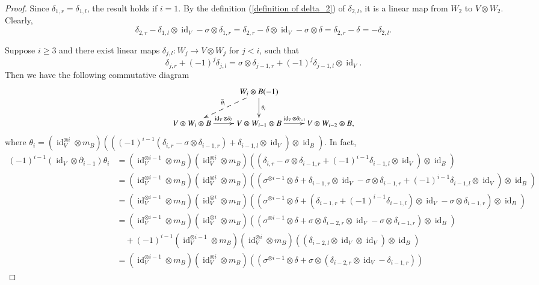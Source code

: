 \documentclass[a4paper,10pt]{amsart}
\theoremstyle{definition}
\numberwithin{equation}{section}
\DeclareMathOperator{\id}{id}
\begin{document}
\begin{proof}
Since $\delta_{1,r}=\delta_{1,l}$, the result holds if $i=1$.
By the definition (\ref{definition of delta_2}) of $\delta_{2,l}$, it is a linear map from  $W_2$ to $V\otimes W_2$. Clearly,
$$
\delta_{2,r}-\delta_{1,l}\otimes\id_V-\sigma\otimes  \delta_{1,r}=\delta_{2,r}-\delta\otimes\id_V-\sigma\otimes \delta=\delta_{2,r}-\delta=-\delta_{2,l}.
$$

Suppose $i\geq 3$ and there exist linear maps $\delta_{j,l}:W_j\to V\otimes W_j$ for  $j< i$, such that
$$
\delta_{j,r}+(-1)^j\delta_{j,l}=\sigma\otimes\delta_{j-1,r}+(-1)^j\delta_{j-1,l}\otimes \id_V.
$$
Then we have the following commutative diagram
$$
\xymatrix{
&W_i\otimes B(-1)  \ar@{-->}[ld]_{\overline{\theta}_i}\ar[d]^{\theta_i}&\\
V\otimes W_i\otimes B\ar[r]^(0.47){\id_V\otimes \partial_i} &V\otimes W_{i-1}\otimes B\ar[r]^{\id_V\otimes \partial_{i-1}} &V\otimes W_{i-2}\otimes B,
}
$$
where
$
\theta_i=(\id_V^{\otimes i }\otimes m_B)\left(\left((-1)^{i-1}\left(\delta_{i,r}-\sigma\otimes\delta_{i-1,r}\right)+\delta_{i-1,l}\otimes \id_V\right)\otimes\id_B\right).
$
In fact,
{\small
\begin{align*}
(-1)^{i-1}(\id_V \otimes \partial_{i-1})\theta_i&=(\id_V^{\otimes i-1} \otimes m_B)(\id_V^{\otimes i }\otimes m_B)\left((\delta_{i,r}-\sigma\otimes\delta_{i-1,r}+(-1)^{i-1}\delta_{i-1,l}\otimes \id_V)\otimes\id_B\right)\\
&=(\id_V^{\otimes i-1} \otimes m_B)(\id_V^{\otimes i }\otimes m_B)\left((\sigma^{\otimes i-1}\otimes \delta+\delta_{i-1,r}\otimes \id_V-\sigma\otimes\delta_{i-1,r}+(-1)^{i-1}\delta_{i-1,l}\otimes \id_V)\otimes\id_B\right)\\
&=(\id_V^{\otimes i-1} \otimes m_B)(\id_V^{\otimes i }\otimes m_B)\left(
(
\sigma^{\otimes i-1}\otimes \delta+(\delta_{i-1,r}+(-1)^{i-1}\delta_{i-1,l})\otimes\id_V-\sigma\otimes\delta_{i-1,r})
\otimes \id_B
\right)\\
&=
(\id_V^{\otimes i-1} \otimes m_B)(\id_V^{\otimes i }\otimes m_B)\left(
(
\sigma^{\otimes i-1}\otimes \delta+\sigma\otimes\delta_{i-2,r}\otimes\id_V-\sigma\otimes\delta_{i-1,r})
\otimes \id_B
\right)\\
&\quad+(-1)^{i-1}(\id_V^{\otimes i-1} \otimes m_B)(\id_V^{\otimes i }\otimes m_B)\left((\delta_{i-2,l}\otimes\id_V\otimes\id_V)\otimes\id_B\right)\\
&=
(\id_V^{\otimes i-1} \otimes m_B)(\id_V^{\otimes i }\otimes m_B)\left(
\left(
\sigma^{\otimes i-1}\otimes \delta+\sigma\otimes(\delta_{i-2,r}\otimes\id_V-\delta_{i-1,r})\right)

\end{align*}}
\end{proof}
\end{document}

